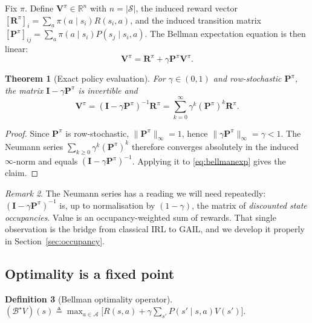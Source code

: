 \documentclass[11pt]{article}
\theoremstyle{plain}
\newtheorem{theorem}{Theorem}[section]
\theoremstyle{definition}
\newtheorem{definition}[theorem]{Definition}
\theoremstyle{remark}
\newtheorem{remark}[theorem]{Remark}
\renewcommand{\S}{\mathcal{S}}
\newcommand{\A}{\mathcal{A}}
\newcommand{\R}{\mathbb{R}}
\begin{document}
Fix $\pi$. Define $\mathbf{V}^\pi \in \R^n$ with $n=|\S|$, the induced
reward vector $[\mathbf{R}^\pi]_i = \sum_a \pi(a\mid s_i)R(s_i,a)$, and the
induced transition matrix $[\mathbf{P}^\pi]_{ij} = \sum_a \pi(a\mid
s_i)P(s_j\mid s_i,a)$. The Bellman expectation equation is then linear:
\begin{equation}
\mathbf{V}^\pi = \mathbf{R}^\pi + \gamma \mathbf{P}^\pi \mathbf{V}^\pi.
\label{eq:bellmanexp}
\end{equation}

\begin{theorem}[Exact policy evaluation]\label{thm:policyeval}
For $\gamma\in(0,1)$ and row-stochastic $\mathbf{P}^\pi$, the matrix
$\mathbf{I}-\gamma\mathbf{P}^\pi$ is invertible and
\begin{equation}
\mathbf{V}^\pi = (\mathbf{I}-\gamma\mathbf{P}^\pi)^{-1}\mathbf{R}^\pi
= \sum_{k=0}^\infty \gamma^k (\mathbf{P}^\pi)^k \mathbf{R}^\pi.
\label{eq:neumann}
\end{equation}
\end{theorem}

\begin{proof}
Since $\mathbf{P}^\pi$ is row-stochastic, $\|\mathbf{P}^\pi\|_\infty=1$,
hence $\|\gamma\mathbf{P}^\pi\|_\infty=\gamma<1$. The Neumann series
$\sum_{k\ge0}\gamma^k(\mathbf{P}^\pi)^k$ therefore converges absolutely in
the induced $\infty$-norm and equals $(\mathbf{I}-\gamma\mathbf{P}^\pi)^{-1}$.
Applying it to \eqref{eq:bellmanexp} gives the claim.
\end{proof}

\begin{remark}
The Neumann series has a reading we will need repeatedly:
$(\mathbf{I}-\gamma\mathbf{P}^\pi)^{-1}$ is, up to normalisation by
$(1-\gamma)$, the matrix of \emph{discounted state occupancies}. Value is
an occupancy-weighted sum of rewards. That single observation is the
bridge from classical IRL to GAIL, and we develop it properly in
Section~\ref{sec:occupancy}.
\end{remark}

\subsection{Optimality is a fixed point}

\begin{definition}[Bellman optimality operator]
$(\mathcal{B}^\star V)(s) \triangleq \max_{a\in\A}\big[R(s,a) +
\gamma\sum_{s'}P(s'\mid s,a)V(s')\big]$.
\end{definition}
\end{document}
